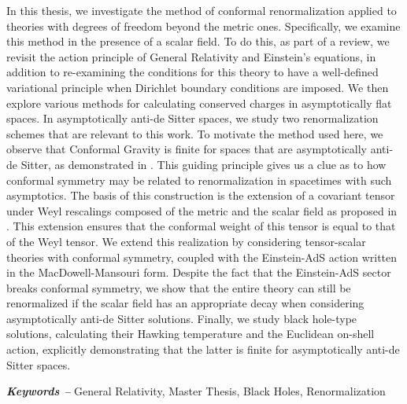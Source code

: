\documentclass[../Main.tex]{subfiles}
\begin{document}
In this thesis, we investigate the method of conformal renormalization applied to theories with degrees of freedom beyond the metric ones. Specifically, we examine this method in the presence of a scalar field. To do this, as part of a review, we revisit the action principle of General Relativity and Einstein's equations, in addition to re-examining the conditions for this theory to have a well-defined variational principle when Dirichlet boundary conditions are imposed. We then explore various methods for calculating conserved charges in asymptotically flat spaces. In asymptotically anti-de Sitter spaces, we study two renormalization schemes that are relevant to this work. To motivate the method used here, we observe that Conformal Gravity is finite for spaces that are asymptotically anti-de Sitter, as demonstrated in \cite{Grumiller_2014}. This guiding principle gives us a clue as to how conformal symmetry may be related to renormalization in spacetimes with such asymptotics. The basis of this construction is the extension of a covariant tensor under Weyl rescalings composed of the metric and the scalar field as proposed in \cite{Oliva:2011np}. This extension ensures that the conformal weight of this tensor is equal to that of the Weyl tensor. We extend this realization by considering tensor-scalar theories with conformal symmetry, coupled with the Einstein-AdS action written in the MacDowell-Mansouri form. Despite the fact that the Einstein-AdS sector breaks conformal symmetry, we show that the entire theory can still be renormalized if the scalar field has an appropriate decay when considering asymptotically anti-de Sitter solutions. Finally, we study black hole-type solutions, calculating their Hawking temperature and the Euclidean on-shell action, explicitly demonstrating that the latter is finite for asymptotically anti-de Sitter spaces.

\par\vspace*{\fill} %
\textbf{\textit{Keywords --}} General Relativity, Master Thesis, Black Holes, Renormalization %

\biblio %
\end{document}
